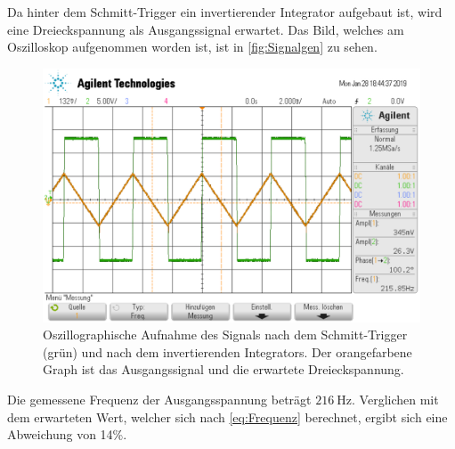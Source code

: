 Da hinter dem Schmitt-Trigger ein invertierender Integrator aufgebaut ist, wird eine Dreieckspannung
als Ausgangssignal erwartet.
Das Bild, welches am Oszilloskop aufgenommen worden ist, ist in \autoref{fig:Signalgen}
zu sehen.
\begin{figure}
    \centering
    \includegraphics[width=0.7\linewidth]{data_of_others_cuz_ours_suck/Signal/Bildschirmfoto vom 2022-02-11 13-19-10.png}
    \caption{Oszillographische Aufnahme des Signals nach dem Schmitt-Trigger (grün) und 
    nach dem invertierenden Integrators. Der orangefarbene Graph ist das Ausgangssignal und die erwartete
    Dreieckspannung.}
    \label{fig:Signalgen}
\end{figure}
\FloatBarrier

Die gemessene Frequenz der Ausgangsspannung beträgt $\SI{216}{\hertz}$.
Verglichen mit dem erwarteten Wert, welcher sich nach \autoref{eq:Frequenz}
berechnet, ergibt sich eine Abweichung von 14\%.

%
